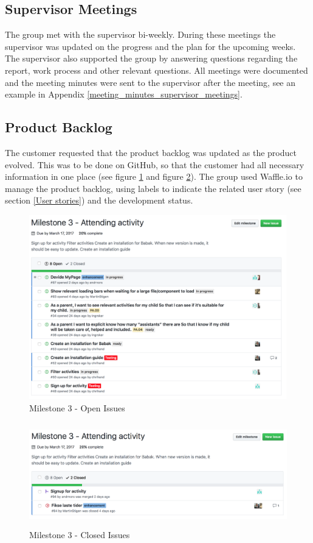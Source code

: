\subsection{Supervisor Meetings}
The group met with the supervisor bi-weekly. During these meetings the supervisor was updated on the progress and the plan for the upcoming weeks. The supervisor also supported the group by answering questions regarding the report, work process and other relevant questions. All meetings were documented and the meeting minutes were sent to the supervisor after the meeting, see an example in Appendix \ref{meeting_minutes_supervisor_meetings}.

\subsection{Product Backlog}
\label{product_backlog}
The customer requested that the product backlog was updated as the product evolved. This was to be done on GitHub, so that the customer had all necessary information in one place (see figure \ref{Open Issues} and figure \ref{Closed Issues}). The group used Waffle.io to manage the product backlog, using labels to indicate the related user story (see section \ref{User stories}) and the development status.


\begin{figure}[ht]
\centering
    \includegraphics[width=\linewidth, height=80mm]{fig/open_issues}
\caption{Milestone 3 - Open Issues}
\label{Open Issues}
\end{figure}

\begin{figure}[ht]
\centering
    \includegraphics[width=\linewidth, height=45mm]{fig/closed_issues}
\caption{Milestone 3 - Closed Issues}
\label{Closed Issues}
\end{figure}

